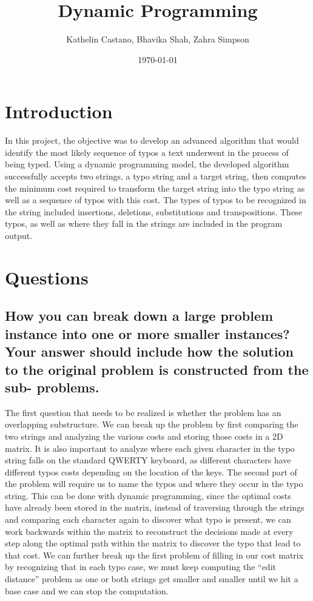 \documentclass[letterpaper,12pt]{article}
\begin{document}
\title{\Huge\textbf{Dynamic Programming} }
\author{Kathelin Castano, Bhavika Shah, Zahra Simpson}
\date{\today}
\maketitle
\clearpage


\section{Introduction}

In this project, the objective was to develop an advanced algorithm that would identify the most likely sequence of typos a text underwent in the process of being typed. Using a dynamic programming model, the developed algorithm successfully accepts two strings, a typo string and a target string, then computes the minimum cost required to transform the target string into the typo string as well as a sequence of typos with this cost. The types of typos to be recognized in the string included insertions, deletions, substitutions and transpositions. These typos, as well as where they fall in the strings are included in the program output. 

\section{Questions}
\subsection{How you can break down a large problem instance into one or more smaller instances? Your answer should include how the solution to the original problem is constructed from the sub- problems.}The first question that needs to be realized is whether the problem has an overlapping substructure. We can break up the problem by first comparing the two strings and analyzing the various costs and storing those costs in a 2D matrix. It is also important to analyze where each given character in the typo string falls on the standard QWERTY keyboard, as different characters have different typos costs depending on the location of the keys. The second part of the problem will require us to name the typos and where they occur in the typo string. This can be done with dynamic programming, since the optimal costs have already been stored in the matrix, instead of traversing through the strings and comparing each character again to discover what typo is present, we can work backwards within the matrix to reconstruct the decisions made at every step along the optimal path within the matrix to discover the typo that lead to that cost. We can further break up the first problem of filling in our cost matrix by recognizing that in each typo case, we must keep computing the “edit distance” problem as one or both strings get smaller and smaller until we hit a base case and we can stop the computation. 
\end{document}
